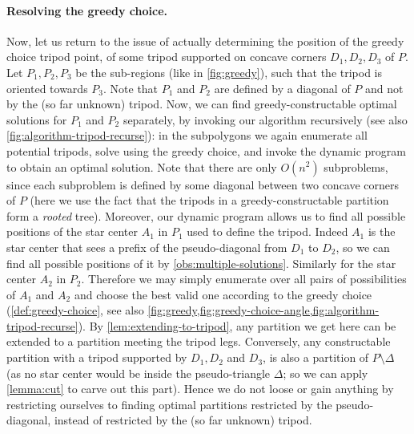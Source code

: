 \documentclass{theoretics}
\begin{document}
\paragraph{Resolving the greedy choice.}
Now, let us return to the issue of actually determining the position of the greedy choice tripod point, of some tripod supported on concave corners $D_1, D_2, D_3$ of $P$. Let $P_1,P_2,P_3$ be the sub-regions (like in \cref{fig:greedy}), such that the tripod is oriented towards $P_3$. Note that $P_1$ and $P_2$ are defined by a diagonal of $P$ and not by the (so far unknown) tripod.
Now, we can find greedy-constructable optimal solutions for $P_1$ and $P_2$ separately, by invoking our algorithm recursively (see also \cref{fig:algorithm-tripod-recurse}): in the subpolygons we again enumerate all potential tripods, solve using the greedy choice, and invoke the dynamic program to obtain an optimal solution. Note that there are only $O(n^2)$ subproblems, since each subproblem is defined by some diagonal between two concave corners of $P$ (here we use the fact that the tripods in a greedy-constructable partition form a \emph{rooted} tree). Moreover, our dynamic program allows us to find all possible positions of the star center $A_1$ in $P_1$ used to define the tripod. Indeed $A_1$ is the star center that sees a prefix of the pseudo-diagonal from $D_1$ to $D_2$, so we can find all possible positions of it by \cref{obs:multiple-solutions}.
Similarly for the star center $A_2$ in $P_2$. Therefore we may simply enumerate over all pairs of possibilities of $A_1$ and $A_2$ and choose the best valid one according to the greedy choice (\cref{def:greedy-choice}, see also \cref{fig:greedy,fig:greedy-choice-angle,fig:algorithm-tripod-recurse}).
By \cref{lem:extending-to-tripod}, any partition we get here can be extended to a partition meeting the tripod legs. 
Conversely, any constructable partition with a tripod supported by $D_1, D_2$ and $D_3$, is also a partition of $P\setminus \Delta$ (as no star center would be inside the pseudo-triangle $\Delta$; so we can apply \cref{lemma:cut} to carve out this part). Hence we do not loose or gain anything by restricting ourselves to finding optimal partitions restricted by the pseudo-diagonal, instead of restricted by the (so far unknown) tripod.

\end{document}
